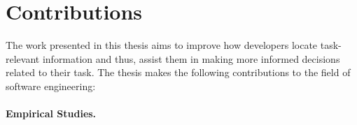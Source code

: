 

\section{Contributions}
\label{cp1:contributions}


The work presented in this thesis 
aims to improve how developers locate task-relevant information and thus, assist them in making more informed decisions related to their task.
The thesis makes the following contributions to the field of software engineering:







    
   
    
    
    




     
    


\paragraph{\textbf{Empirical Studies.}} 

